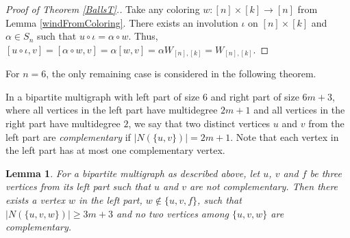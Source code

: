 \documentclass[12pt]{article}
\newtheorem{lemma}{Lemma}[section]
\theoremstyle{definition}
\theoremstyle{plain}
\renewcommand{\ge}{\geqslant}
\begin{document}


\begin {proof}[Proof of Theorem \ref{BallsT}.]
Take any coloring $w : [n] \times [k] \rightarrow [n]$ from Lemma \ref{windFromColoring}. There exists an involution $\iota$ on $[n] \times [k]$ and $\alpha \in S_n$ such that $u \circ \iota = \alpha \circ w$. Thus, $[u \circ \iota, v] = [\alpha \circ w, v] = \alpha [w,v] = \alpha W_{[n],[k]} = W_{[n],[k]}$.
\end {proof}

For $n=6$, the only remaining case is considered in the following theorem.

In a bipartite multigraph with left part of size $6$ and right part of size $6m+3$, where all vertices in the left part have multidegree $2m+1$ and all vertices in the right part have multidegree $2$, we say that two distinct vertices $u$ and $v$ from the left part are \emph{complementary} if $|N(\{u,v\})| = 2m+1$. Note that each vertex in the left part has at most one complementary vertex.

\begin{lemma}\label{find3}
For a bipartite multigraph as described above, let $u$, $v$ and $f$ be three vertices from its left part such that $u$ and $v$ are not complementary. Then there exists a vertex $w$ in the left part, $w \notin \{u,v,f\}$, such that $|N(\{u,v,w\})| \ge 3m+3$ and no two vertices among $\{u,v,w\}$ are complementary.
\end{lemma}
\end{document}
